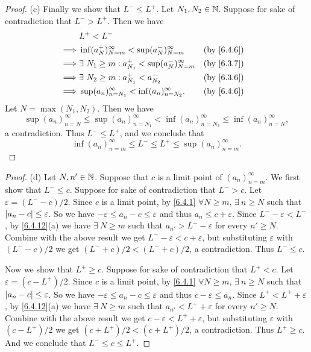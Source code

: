 \begin{proof}{(c)}
  Finally we show that \(L^- \leq L^+\).
  Let \(N_1, N_2 \in \mathbb{N}\).
  Suppose for sake of contradiction that \(L^- > L^+\).
  Then we have
  \begin{align*}
             & L^+ < L^-                                                                                  \\
    \implies & \inf(a_N^+)_{N = m}^\infty < \sup(a_N^-)_{N = m}^\infty      &  & \text{(by \cref{6.4.6})} \\
    \implies & \exists\ N_1 \geq m : a_{N_1}^+ < \sup(a_N^-)_{N = m}^\infty &  & \text{(by \cref{6.3.7})} \\
    \implies & \exists\ N_2 \geq m : a_{N_1}^+ < a_{N_2}^-                  &  & \text{(by \cref{6.3.6})} \\
    \implies & \sup(a_n)_{n = N_1}^\infty < \inf(a_n)_{n = N_2}^\infty.     &  & \text{(by \cref{6.4.6})}
  \end{align*}
  Let \(N = \max(N_1, N_2)\).
  Then we have
  \[
    \sup(a_n)_{n = N}^\infty \leq \sup(a_n)_{n = N_1}^\infty < \inf(a_n)_{n = N_2}^\infty \leq \inf(a_n)_{n = N}^\infty,
  \]
  a contradiction.
  Thus \(L^- \leq L^+\), and we conclude that
  \[
    \inf(a_n)_{n = m}^\infty \leq L^- \leq L^+ \leq \sup(a_n)_{n = m}^\infty.
  \]
\end{proof}

\begin{proof}{(d)}
  Let \(N, n' \in \mathbb{N}\).
  Suppose that \(c\) is a limit point of \((a_n)_{n = m}^\infty\).
  We first show that \(L^- \leq c\).
  Suppose for sake of contradiction that \(L^- > c\).
  Let \(\varepsilon = (L^- - c) / 2\).
  Since \(c\) is a limit point, by \cref{6.4.1} \(\forall N \geq m\), \(\exists\ n \geq N\) such that \(\left\lvert a_n - c\right\rvert \leq \varepsilon\).
  So we have \(-\varepsilon \leq a_n - c \leq \varepsilon\) and thus \(a_n \leq c + \varepsilon\).
  Since \(L^- - \varepsilon < L^-\), by \cref{6.4.12}(a) we have \(\exists\ N \geq m\) such that \(a_{n'} > L^- - \varepsilon\) for every \(n' \geq N\).
  Combine with the above result we get \(L^- - \varepsilon < c + \varepsilon\), but substituting \(\varepsilon\) with \((L^- - c) / 2\) we get \((L^- + c) / 2 < (L^- + c) / 2\), a contradiction.
  Thus \(L^- \leq c\).

  Now we show that \(L^+ \geq c\).
  Suppose for sake of contradiction that \(L^+ < c\).
  Let \(\varepsilon = (c - L^+) / 2\).
  Since \(c\) is a limit point, by \cref{6.4.1} \(\forall N \geq m\), \(\exists\ n \geq N\) such that \(\left\lvert a_n - c\right\rvert \leq \varepsilon\).
  So we have \(-\varepsilon \leq a_n - c \leq \varepsilon\) and thus \(c - \varepsilon \leq a_n\).
  Since \(L^+ < L^+ + \varepsilon\), by \cref{6.4.12}(a) we have \(\exists\ N \geq m\) such that \(a_{n'} < L^+ + \varepsilon\) for every \(n' \geq N\).
  Combine with the above result we get \(c - \varepsilon < L^+ + \varepsilon\), but substituting \(\varepsilon\) with \((c - L^+) / 2\) we get \((c + L^+) / 2 < (c + L^+) / 2\), a contradiction.
  Thus \(L^+ \geq c\).
  And we conclude that \(L^- \leq c \leq L^+\).
\end{proof}

